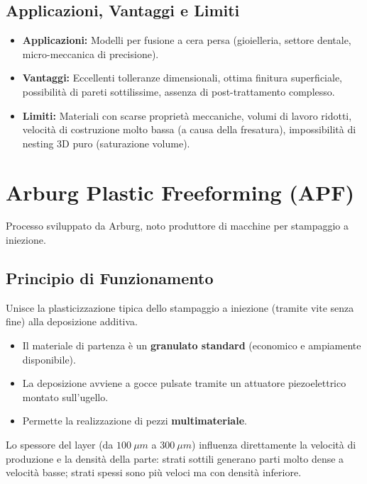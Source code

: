 \subsection{Applicazioni, Vantaggi e Limiti}
\begin{itemize}
    \item \textbf{Applicazioni:} Modelli per fusione a cera persa (gioielleria, settore dentale, micro-meccanica di precisione).
    \item \textbf{Vantaggi:} Eccellenti tolleranze dimensionali, ottima finitura superficiale, possibilità di pareti sottilissime, assenza di post-trattamento complesso.
    \item \textbf{Limiti:} Materiali con scarse proprietà meccaniche, volumi di lavoro ridotti, velocità di costruzione molto bassa (a causa della fresatura), impossibilità di nesting 3D puro (saturazione volume).
\end{itemize}

%
\section{Arburg Plastic Freeforming (APF)}
Processo sviluppato da Arburg, noto produttore di macchine per stampaggio a iniezione.

\subsection{Principio di Funzionamento}
Unisce la plasticizzazione tipica dello stampaggio a iniezione (tramite vite senza fine) alla deposizione additiva.
\begin{itemize}
    \item Il materiale di partenza è un \textbf{granulato standard} (economico e ampiamente disponibile).
    \item La deposizione avviene a gocce pulsate tramite un attuatore piezoelettrico montato sull'ugello.
    \item Permette la realizzazione di pezzi \textbf{multimateriale}.
\end{itemize}

\begin{remark}
    Lo spessore del layer (da $100~\mu m$ a $300~\mu m$) influenza direttamente la velocità di produzione e la densità della parte: strati sottili generano parti molto dense a velocità basse; strati spessi sono più veloci ma con densità inferiore.
\end{remark}
